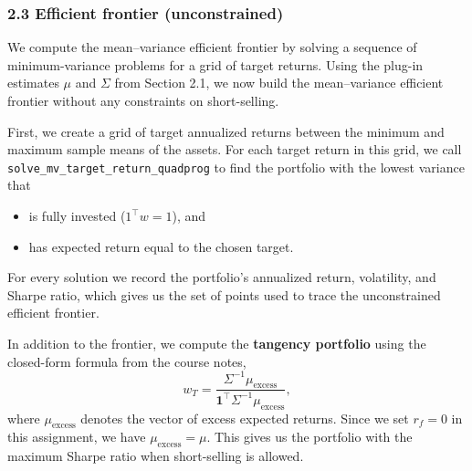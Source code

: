 \documentclass[11pt]{article}
\providecommand{\tightlist}{%
      \setlength{\itemsep}{0pt}\setlength{\parskip}{0pt}}
\begin{document}
    \hypertarget{efficient-frontier-unconstrained}{%
\subsubsection{2.3 Efficient frontier
(unconstrained)}\label{efficient-frontier-unconstrained}}

We compute the mean--variance efficient frontier by solving a sequence
of minimum-variance problems for a grid of target returns. Using the
plug-in estimates \(\mu\) and \(\Sigma\) from Section 2.1, we now build
the mean--variance efficient frontier without any constraints on
short-selling.

First, we create a grid of target annualized returns between the minimum
and maximum sample means of the assets. For each target return in this
grid, we call \texttt{solve\_mv\_target\_return\_quadprog} to find the
portfolio with the lowest variance that

\begin{itemize}
\tightlist
\item
  is fully invested (\(1^\top w = 1\)), and\\
\item
  has expected return equal to the chosen target.
\end{itemize}

For every solution we record the portfolio's annualized return,
volatility, and Sharpe ratio, which gives us the set of points used to
trace the unconstrained efficient frontier.

In addition to the frontier, we compute the \textbf{tangency portfolio}
using the closed-form formula from the course notes, \[
w_T = \frac{\Sigma^{-1} \mu_{\text{excess}}}{\mathbf{1}^\top \Sigma^{-1} \mu_{\text{excess}}},
\] where \(\mu_{\text{excess}}\) denotes the vector of excess expected
returns. Since we set \(r_f = 0\) in this assignment, we have
\(\mu_{\text{excess}} = \mu\). This gives us the portfolio with the
maximum Sharpe ratio when short-selling is allowed.
\end{document}
